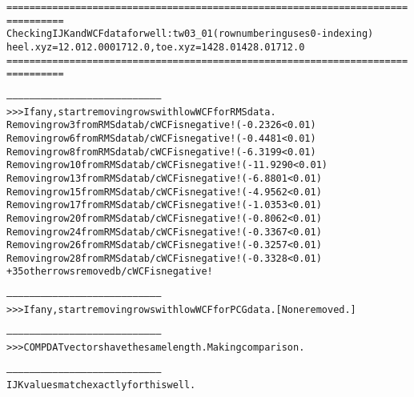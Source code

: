 \begin{alltt}
================================================================================
Checking IJK and WCF data for well: tw03_01 (row numbering uses 0-indexing)
heel.xyz =  12.0 12.000 1712.0, toe.xyz = 1428.0 1428.0 1712.0
================================================================================

--------------------------------------------------------------------------------
>>> If any, start removing rows with low WCF for RMS data.
Removing row 3 from RMS data b/c WCF is negative! (-0.2326 < 0.01)
Removing row 6 from RMS data b/c WCF is negative! (-0.4481 < 0.01)
Removing row 8 from RMS data b/c WCF is negative! (-6.3199 < 0.01)
Removing row 10 from RMS data b/c WCF is negative! (-11.9290 < 0.01)
Removing row 13 from RMS data b/c WCF is negative! (-6.8801 < 0.01)
Removing row 15 from RMS data b/c WCF is negative! (-4.9562 < 0.01)
Removing row 17 from RMS data b/c WCF is negative! (-1.0353 < 0.01)
Removing row 20 from RMS data b/c WCF is negative! (-0.8062 < 0.01)
Removing row 24 from RMS data b/c WCF is negative! (-0.3367 < 0.01)
Removing row 26 from RMS data b/c WCF is negative! (-0.3257 < 0.01)
Removing row 28 from RMS data b/c WCF is negative! (-0.3328 < 0.01)
+35 other rows removed b/c WCF is negative!

--------------------------------------------------------------------------------
>>> If any, start removing rows with low WCF for PCG data. [None removed.]

--------------------------------------------------------------------------------
>>> COMPDAT vectors have the same length. Making comparison.

--------------------------------------------------------------------------------
IJK values match exactly for this well.


\end{alltt}
